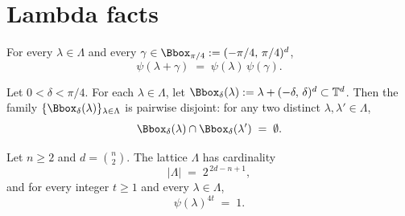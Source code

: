 %

\chapter{Lambda facts}
\label{chap:lambda-facts}

\begin{lemma}
\label{lem:psi-translate}
For every $\lambda \in \Lambda$ and every $\gamma \in \Bbox_{\pi/4}
:= (-\pi/4,\,\pi/4)^d$,
\[
  \psi(\lambda + \gamma) \;=\; \psi(\lambda)\,\psi(\gamma).
\]
\end{lemma}

\begin{lemma}
\label{lem:disjoint-boxes}
Let $0 < \delta < \pi/4$. For each $\lambda \in \Lambda$, let
$\Bbox_\delta(\lambda) := \lambda + (-\delta,\,\delta)^d \subset \mathbb{T}^d$.
Then the family $\{\Bbox_\delta(\lambda)\}_{\lambda \in \Lambda}$ is
pairwise disjoint: for any two distinct $\lambda, \lambda' \in \Lambda$,
\[
  \Bbox_\delta(\lambda) \cap \Bbox_\delta(\lambda') \;=\; \emptyset.
\]
\end{lemma}

\begin{lemma}
\label{lem:lambda-card}
Let $n \ge 2$ and $d = \binom{n}{2}$. The lattice $\Lambda$ has cardinality
\[
  |\Lambda| \;=\; 2^{\,2d - n + 1},
\]
and for every integer $t \ge 1$ and every $\lambda \in \Lambda$,
\[
  \psi(\lambda)^{4t} \;=\; 1.
\]
\end{lemma}

